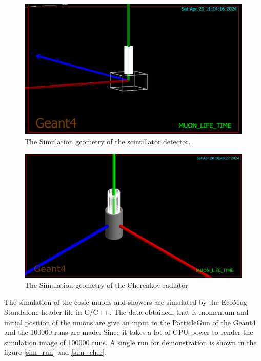 \documentclass{article}
\begin{document}
\begin{multicols}{2}
\begin{figure}[H]
    \centering
    \includegraphics[width = \columnwidth]{Images/scint_sim_1.png}
    \caption{The Simulation geometry of the scintillator detector.\cite{agostinelli2003geant4}}
    \label{scintgeo}
\end{figure}


\begin{figure}[H]
    \centering
    \includegraphics[width = \columnwidth]{Images/cher_sim_1.jpeg}
    \caption{The Simulation geometry of the Cherenkov radiator\cite{agostinelli2003geant4}}
    \label{chergeo}
\end{figure}

The simulation of the cosic muons and showers are simulated by the EcoMug Standalone header file in C/C++. The data obtained, that is momentum and initial position of the muons are give an input to the ParticleGun of the Geant4 and the 100000 runs are made. Since it takes a lot of GPU power to render the simulation image of 100000 runs. A single run for demonstration is shown in the figure-\ref{sim_run} and \ref{sim_cher}.


\end{multicols}
\end{document}
